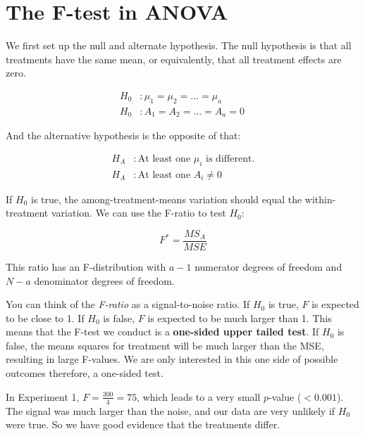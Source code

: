 \documentclass[
  letterpaper,
]{book}
\begin{document}
\section{The F-test in ANOVA}\label{the-f-test-in-anova}

We first set up the null and alternate hypothesis. The null hypothesis
is that all treatments have the same mean, or equivalently, that all
treatment effects are zero.

\[
\begin{aligned}
H_0&: \mu_1 = \mu_2 = \ldots = \mu_a \\
H_0&: A_1 = A_2 = \ldots = A_a = 0\
\end{aligned}
\]

And the alternative hypothesis is the opposite of that:

\[
\begin{aligned}
H_A&: \text{At least one } \mu_i \text{ is different.} \\
H_A&: \text{At least one } A_i \neq 0
\end{aligned}
\]


If \(H_0\) is true, the among-treatment-means variation should equal the
within-treatment variation. We can use the F-ratio to test \(H_0\):

\[ F^* = \frac{MS_A}{MSE} \]

This ratio has an F-distribution with \(a-1\) numerator degrees of
freedom and \(N-a\) denominator degrees of freedom.

You can think of the \emph{F-ratio} as a signal-to-noise ratio. If
\(H_0\) is true, \(F\) is expected to be close to 1. If \(H_0\) is
false, \(F\) is expected to be much larger than 1. This means that the
F-test we conduct is a \textbf{one-sided upper tailed test}. If \(H_0\)
is false, the means squares for treatment will be much larger than the
MSE, resulting in large F-values. We are only interested in this one
side of possible outcomes therefore, a one-sided test.

In Experiment 1, \(F = \frac{300}{4} = 75\), which leads to a very small
\(p\)-value (\(< 0.001\)). The signal was much larger than the noise,
and our data are very unlikely if \(H_0\) were true. So we have good
evidence that the treatments differ.
\end{document}
